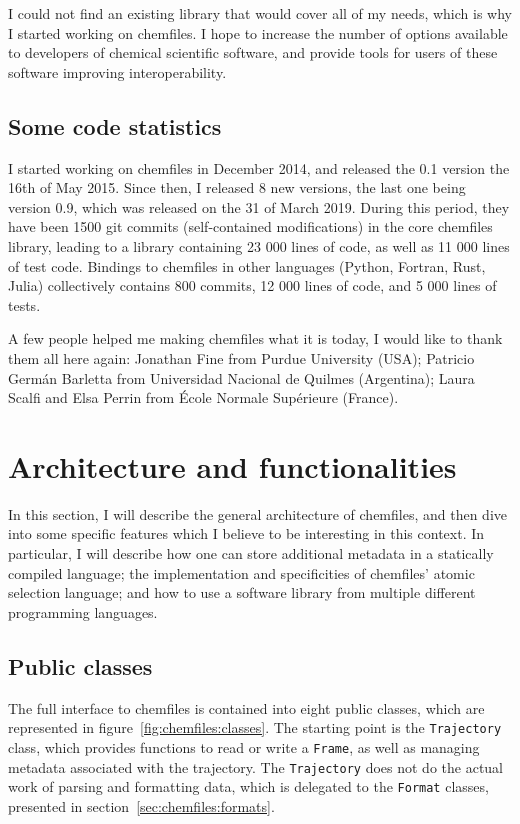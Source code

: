 \documentclass[thesis]{subfiles}
\begin{document}
I could not find an existing library that would cover all of my needs, which is
why I started working on chemfiles. I hope to increase the number of options
available to developers of chemical scientific software, and provide tools for
users of these software improving interoperability.

\subsection{Some code statistics}

I started working on chemfiles in December 2014, and released the 0.1 version
the 16th of May 2015. Since then, I released 8 new versions, the last one being
version 0.9, which was released on the 31 of March 2019. During this period,
they have been 1500 git commits (self-contained modifications) in the core \cxx
chemfiles library, leading to a library containing 23 000 lines of code, as well
as 11 000 lines of test code. Bindings to chemfiles in other languages (Python,
Fortran, Rust, Julia) collectively contains 800 commits, 12 000 lines of code,
and 5 000 lines of tests.

A few people helped me making chemfiles what it is today, I would like to thank
them all here again: Jonathan Fine from Purdue University (USA); Patricio Germán
Barletta from Universidad Nacional de Quilmes (Argentina); Laura Scalfi and Elsa
Perrin from École Normale Supérieure (France).

\section{Architecture and functionalities}

In this section, I will describe the general architecture of chemfiles, and then
dive into some specific features which I believe to be interesting in this
context. In particular, I will describe how one can store additional metadata in
a statically compiled language; the implementation and specificities of chemfiles'
atomic selection language; and how to use a software library from multiple
different programming languages.

\subsection{Public classes}

The full interface to chemfiles is contained into eight public classes, which
are represented in figure~\ref{fig:chemfiles:classes}. The starting point is the
\texttt{Trajectory} class, which provides functions to read or write a
\texttt{Frame}, as well as managing metadata associated with the trajectory. The
\texttt{Trajectory} does not do the actual work of parsing and formatting data,
which is delegated to the \texttt{Format} classes, presented in
section~\ref{sec:chemfiles:formats}.
\end{document}
